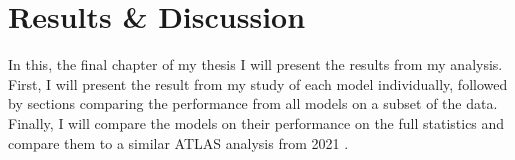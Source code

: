 \chapter{Results \& Discussion}\label{subsec:ResDisc}
In this, the final chapter of my thesis I will present the results from my analysis. First,
I will present the result from my study of each model individually, followed by sections 
comparing the performance from all models on a subset of the data. Finally, I will compare 
the models on their performance on the full statistics and compare them to a similar \ac{ATLAS} 
analysis from 2021 \cite{atlas_search_2021}.

